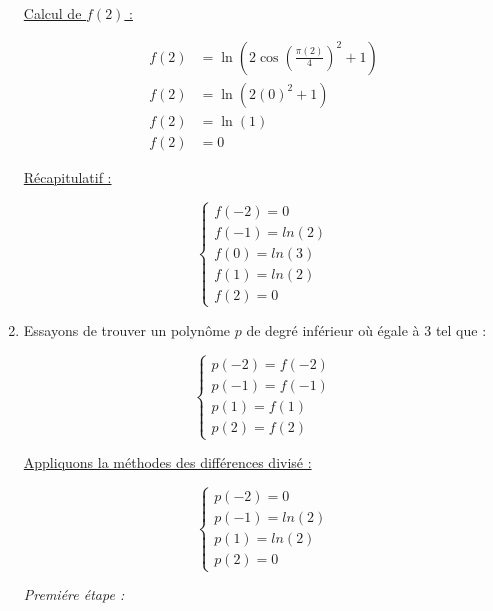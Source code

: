 \documentclass[12pt, letterpaper]{article}
\begin{document}
\begin{enumerate}
  \underline{Calcul de $f(2)$ :}
  
  \begin{equation*}
    \begin{split}
      f(2) & = \ln(2\cos \left( \frac{\pi(2)}{4} \right)^2 + 1) \\
      f(2) & = \ln(2(0)^2 + 1) \\
      f(2) & = \ln(1) \\
      f(2) & = 0
    \end{split}
  \end{equation*}

  \underline{Récapitulatif :}

  $$
  \left\{
  \begin{array}{l}
    f(-2) = 0 \\
    f(-1) = ln(2) \\
    f(0) = ln(3) \\
    f(1) = ln(2) \\
    f(2) = 0
  \end{array}
  \right.
  $$

\item Essayons de trouver un polynôme $p$ de degré inférieur où égale
  à 3 tel que :

  \begin{equation*}
    \left\{
    \begin{array}{l}
      p(-2) = f(-2) \\
      p(-1) = f(-1) \\
      p(1) = f(1) \\
      p(2) = f(2) 
    \end{array}
    \right.
  \end{equation*}

  \underline{Appliquons la méthodes des différences divisé :}

  \begin{equation*}
    \left\{
    \begin{array}{l}
      p(-2) = 0 \\
      p(-1) = ln(2) \\
      p(1) = ln(2) \\
      p(2) = 0 
    \end{array}
    \right.
  \end{equation*}

  \textit{Premiére étape :}

  \begin{equation*}
    \left.
    \begin{array}{ll}
       

\end{array}
\end{equation*}
\end{enumerate}
\end{document}

